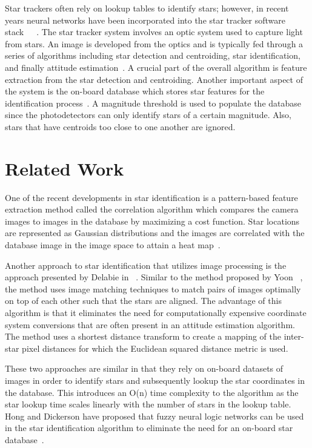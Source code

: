\documentclass[10pt,twocolumn,letterpaper]{article}
\begin{document}
Star trackers often rely on lookup tables to identify stars; however, in recent years neural networks have been incorporated into the star tracker software stack~\cite{lowcost}~\cite{neural1}~\cite{neural2}. The star tracker system involves an optic system used to capture light from stars. An image is developed from the optics and is typically fed through a series of algorithms including star detection and centroiding, star identification, and finally attitude estimation~\cite{survey}. A crucial part of the overall algorithm is feature extraction from the star detection and centroiding. Another important aspect of the system is the on-board database which stores star features for the identification process~\cite{survey}. A magnitude threshold is used to populate the database since the photodetectors can only identify stars of a certain magnitude. Also, stars that have centroids too close to one another are ignored.


\section{Related Work}
\label{sec:related}

One of the recent developments in star identification is a pattern-based feature extraction method called the correlation algorithm which compares the camera images to images in the database by maximizing a cost function. Star locations are represented as Gaussian distributions and the images are correlated with the database image in the image space to attain a heat map~\cite{corr}.

Another approach to star identification that utilizes image processing is the approach presented by Delabie \etal in ~\cite{optimal}. Similar to the method proposed by Yoon \etal ~\cite{corr}, the method uses image matching techniques to match pairs of images optimally on top of each other such that the stars are aligned. The advantage of this algorithm is that it eliminates the need for computationally expensive coordinate system conversions that are often present in an attitude estimation algorithm. The method uses a shortest distance transform to create a mapping of the inter-star pixel distances for which the Euclidean squared distance metric is used.

These two approaches are similar in that they rely on on-board datasets of images in order to identify stars and subsequently lookup the star coordinates in the database. This introduces an O(n) time complexity to the algorithm as the star lookup time scales linearly with the number of stars in the lookup table. Hong and Dickerson have proposed that fuzzy neural logic networks can be used in the star identification algorithm to eliminate the need for an on-board star database~\cite{neural1}.
\end{document}
